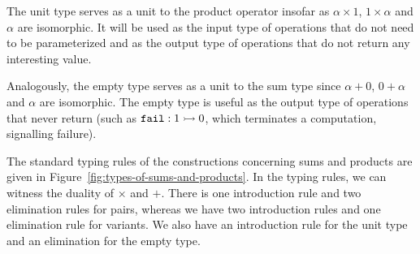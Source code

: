 The unit type serves as a unit to the product operator insofar as $\alpha
\times 1$, $1 \times \alpha$ and $\alpha$ are isomorphic. It will be used
as the input type of operations that do not need to be parameterized and as
the output type of operations that do not return any interesting value.

Analogously, the empty type serves as a unit to the sum type since $\alpha
+ 0$, $0 + \alpha$ and $\alpha$ are isomorphic. The empty type is useful as
the output type of operations that never return (such as
$\mathtt{fail} : 1 \rightarrowtail 0$, which terminates a computation, signalling failure).

The standard typing rules of the constructions concerning sums and products
are given in Figure~\ref{fig:types-of-sums-and-products}. In the typing
rules, we can witness the duality of $\times$ and $+$. There is one
introduction rule and two elimination rules for pairs, whereas we have two
introduction rules and one elimination rule for variants. We also have an
introduction rule for the unit type and an elimination for the empty type.

